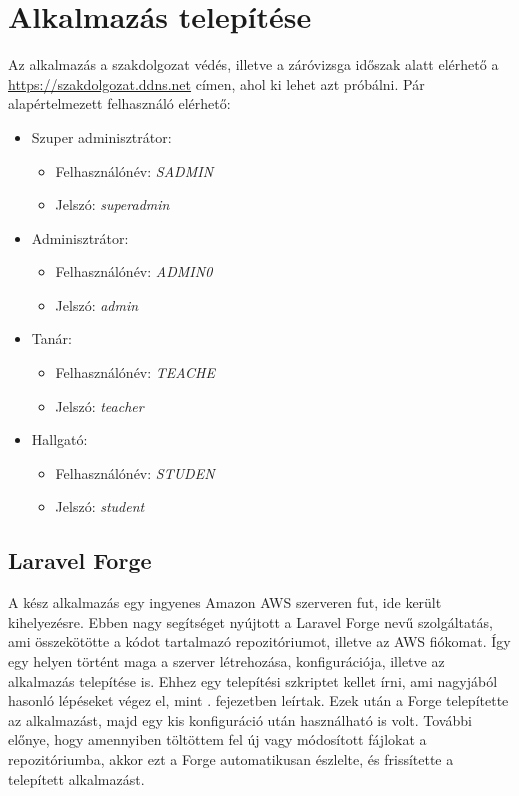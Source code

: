 \documentclass[
]{thesis-ekf}
\theoremstyle{definition}
\theoremstyle{remark}
\begin{document}
\chapter{Alkalmazás telepítése}
\label{setup}
Az alkalmazás a szakdolgozat védés, illetve a záróvizsga időszak alatt elérhető a \url{https://szakdolgozat.ddns.net} címen, ahol ki lehet azt próbálni. Pár alapértelmezett felhasználó elérhető:
\begin{itemize}
	\item Szuper adminisztrátor:
	\begin{itemize}
		\item Felhasználónév: \emph{SADMIN}
		\item Jelszó: \emph{superadmin}
	\end{itemize}
	\item Adminisztrátor:
	\begin{itemize}
		\item Felhasználónév: \emph{ADMIN0}
		\item Jelszó: \emph{admin}
	\end{itemize}
	\item Tanár:
	\begin{itemize}
		\item Felhasználónév: \emph{TEACHE}
		\item Jelszó: \emph{teacher}
	\end{itemize}
	\item Hallgató:
	\begin{itemize}
		\item Felhasználónév: \emph{STUDEN}
		\item Jelszó: \emph{student}
	\end{itemize}
\end{itemize}
\section{Laravel Forge}

A kész alkalmazás egy ingyenes Amazon AWS\cite{aws} szerveren fut, ide került kihelyezésre. Ebben nagy segítséget nyújtott a Laravel Forge\cite{forge} nevű szolgáltatás, ami összekötötte a kódot tartalmazó repozitóriumot, illetve az AWS fiókomat. Így egy helyen történt maga a szerver létrehozása, konfigurációja, illetve az alkalmazás telepítése is. Ehhez egy telepítési szkriptet kellet írni, ami nagyjából hasonló lépéseket végez el, mint . fejezetben leírtak. Ezek után a Forge telepítette az alkalmazást, majd egy kis konfiguráció után használható is volt. További előnye, hogy amennyiben töltöttem fel új vagy módosított fájlokat a repozitóriumba, akkor ezt a Forge automatikusan észlelte, és frissítette a telepített alkalmazást.
\end{document}
